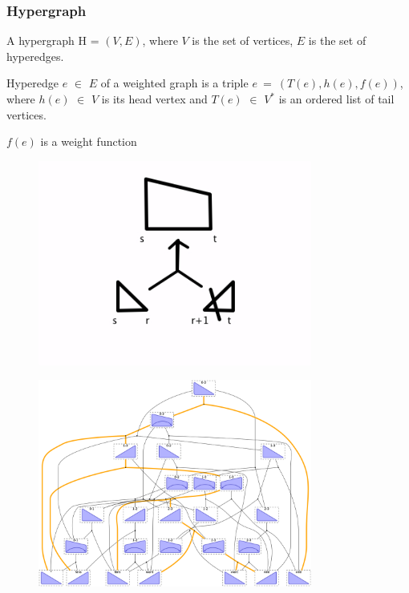 \documentclass{beamer}
\begin{document}
\begin{frame}
\frametitle{Hypergraph}

A hypergraph  H = $(V, E)$, where $V$ is the set of vertices, $E$ is the set of hyperedges.

Hyperedge $e$ $\in$ $E$ of a weighted graph is a triple $e~=~(T(e), h(e), f(e))$, where $h(e)$ $\in$ $V$ is its head vertex and $T(e)$ $\in$ $V^*$ is an ordered list of tail vertices.

$f(e)$ is a weight function
\end{frame}

\begin{frame}

\begin{figure}
\centering
\includegraphics[width=90mm]{images/hypergraph_example.jpg}
\end{figure}

\end{frame}

\begin{frame}

\begin{figure}
\centering
\includegraphics[width=90mm]{images/hypergraph.png}
\end{figure}

\end{frame}
\end{document}
